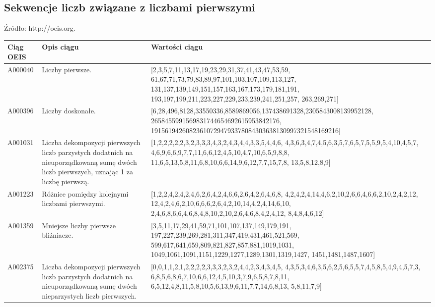 \documentclass[10pt,onecolumn]{article}
\theoremstyle{definition}
\theoremstyle{hypothesis}
\theoremstyle{capability}
\begin{document}
\begin{landscape}

\section{Sekwencje liczb związane z liczbami pierwszymi}

Źródło: http://oeis.org.

\begin{tabular}{|C{1.8cm}|L{6cm}|L{16cm}|}
  \hline 
  Ciąg OEIS & Opis ciągu & Wartości ciągu \\
  \hline
A000040 & Liczby pierwsze. &
[2,3,5,7,11,13,17,19,23,29,31,37,41,43,47,53,59,
 61,67,71,73,79,83,89,97,101,103,107,109,113,127,
 131,137,139,149,151,157,163,167,173,179,181,191,
 193,197,199,211,223,227,229,233,239,241,251,257,
 263,269,271] \\
  \hline
A000396 & Liczby doskonałe. &
[6,28,496,8128,33550336,8589869056,137438691328,2305843008139952128,
 2658455991569831744654692615953842176,
 191561942608236107294793378084303638130997321548169216] \\
  \hline
A001031 & Liczba dekompozycji pierwszych liczb parzystych dodatnich na nieuporządkowaną sumę dwóch liczb pierwszych, uznając 1 za liczbę pierwszą. & 
[1,2,2,2,2,2,3,2,3,3,3,4,3,2,4,3,4,4,3,3,5,4,4,6,
 4,3,6,3,4,7,4,5,6,3,5,7,6,5,7,5,5,9,5,4,10,4,5,7,
 4,6,9,6,6,9,7,7,11,6,6,12,4,5,10,4,7,10,6,5,9,8,8,
 11,6,5,13,5,8,11,6,8,10,6,6,14,9,6,12,7,7,15,7,8,
 13,5,8,12,8,9] \\
  \hline
A001223 & Różnice pomiędzy kolejnymi liczbami pierwszymi. & 
[1,2,2,4,2,4,2,4,6,2,6,4,2,4,6,6,2,6,4,2,6,4,6,8,
 4,2,4,2,4,14,4,6,2,10,2,6,6,4,6,6,2,10,2,4,2,12,
 12,4,2,4,6,2,10,6,6,6,2,6,4,2,10,14,4,2,4,14,6,10,
 2,4,6,8,6,6,4,6,8,4,8,10,2,10,2,6,4,6,8,4,2,4,12,
 8,4,8,4,6,12] \\
  \hline
A001359 & Mniejsze liczby pierwsze bliźniacze. & 
[3,5,11,17,29,41,59,71,101,107,137,149,179,191,
 197,227,239,269,281,311,347,419,431,461,521,569,
 599,617,641,659,809,821,827,857,881,1019,1031,
 1049,1061,1091,1151,1229,1277,1289,1301,1319,1427,
 1451,1481,1487,1607] \\
  \hline
A002375 & Liczba dekompozycji pierwszych liczb parzystych dodatnich na nieuporządkowaną sumę dwóch nieparzystych liczb pierwszych. & 
[0,0,1,1,2,1,2,2,2,2,3,3,3,2,3,2,4,4,2,3,4,3,4,5,
 4,3,5,3,4,6,3,5,6,2,5,6,5,5,7,4,5,8,5,4,9,4,5,7,3,
 6,8,5,6,8,6,7,10,6,6,12,4,5,10,3,7,9,6,5,8,7,8,11,
 6,5,12,4,8,11,5,8,10,5,6,13,9,6,11,7,7,14,6,8,13,
 5,8,11,7,9] \\

\end{tabular}
\end{landscape}
\end{document}
